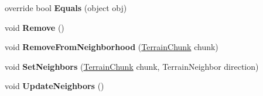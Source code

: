 \begin{DoxyCompactItemize}
override bool {\bfseries Equals} (object obj)
\item 
\mbox{\label{class_terrain_generator_1_1_terrain_chunk_a8f6386d959671bf8a475dcecaa4d16a5}} 
void {\bfseries Remove} ()
\item 
\mbox{\label{class_terrain_generator_1_1_terrain_chunk_a7f3cc12fa84622ca69eb876be517b4fc}} 
void {\bfseries Remove\+From\+Neighborhood} (\hyperlink{class_terrain_generator_1_1_terrain_chunk}{Terrain\+Chunk} chunk)
\item 
\mbox{\label{class_terrain_generator_1_1_terrain_chunk_a9c976cc785c470d6b4465bc991620251}} 
void {\bfseries Set\+Neighbors} (\hyperlink{class_terrain_generator_1_1_terrain_chunk}{Terrain\+Chunk} chunk, Terrain\+Neighbor direction)
\item 
\mbox{\label{class_terrain_generator_1_1_terrain_chunk_ac8c0ec285cb9d452f23f20e91e866cce}} 
void {\bfseries Update\+Neighbors} ()
\end{DoxyCompactItemize}
